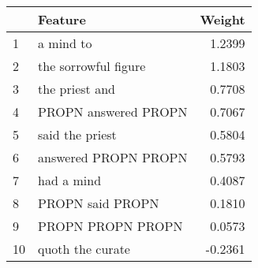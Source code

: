 \begin{tabular}{llr}
\toprule
{} &               Feature &  Weight \\
\midrule
1  &             a mind to &  1.2399 \\
2  &  the sorrowful figure &  1.1803 \\
3  &        the priest and &  0.7708 \\
4  &  PROPN answered PROPN &  0.7067 \\
5  &       said the priest &  0.5804 \\
6  &  answered PROPN PROPN &  0.5793 \\
7  &            had a mind &  0.4087 \\
8  &      PROPN said PROPN &  0.1810 \\
9  &     PROPN PROPN PROPN &  0.0573 \\
10 &      quoth the curate & -0.2361 \\
\bottomrule
\end{tabular}
